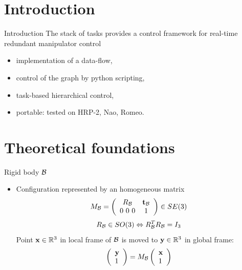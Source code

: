 \section{Introduction}
%
%
\begin{frame} {Introduction}
  The stack of tasks provides a control framework for real-time redundant manipulator control
  \pause
  \begin{itemize}
  \item implementation of a data-flow,
  \pause
  \item control of the graph by python scripting,
  \pause
  \item task-based hierarchical control,
  \pause
  \item portable: tested on HRP-2, Nao, Romeo.
\end{itemize}
\end{frame}

\section{Theoretical foundations}

%
%

\begin{frame} {Rigid body ${\cal B}$}
  \begin{itemize}
    \item Configuration represented by an homogeneous matrix
      $$
      M_{{\cal B}} = \left(\begin{array}{cc}
        R_{{\cal B}} & \textbf{t}_{{\cal B}}\\
        0 \ 0 \ 0 & 1 
      \end{array}\right) \in SE(3)
      $$
      \pause
      $$
      R_{{\cal B}} \in SO(3) \Leftrightarrow R_{{\cal B}}^{T}R_{{\cal B}} = I_3
      $$
      \pause
      Point $\textbf{x}\in\mathbb{R}^3$ in local frame of ${\cal B}$ is moved to $\textbf{y}\in\mathbb{R}^3$ in global frame:
      $$
      \left(\begin{array}{l}
        \textbf{y} \\ 1
      \end{array}\right) =
      M_{{\cal B}} \left(\begin{array}{l} \textbf{x} \\ 1
      \end{array}\right)
      $$
  \end{itemize}
\end{frame}

%
%

